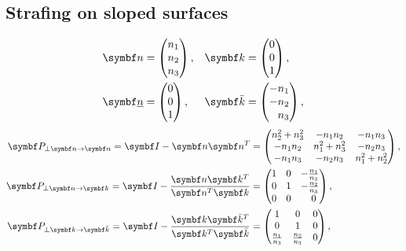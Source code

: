 \subsection{Strafing on sloped surfaces}
\label{sec:slopes}
\begin{align*}
\vec{n} &=
\begin{pmatrix}
n_1\\n_2\\n_3
\end{pmatrix}, & \vec{k} &=
\begin{pmatrix}
0\\0\\1
\end{pmatrix},\\
\vec{\flat{n}} &=
\begin{pmatrix}
0\\0\\1
\end{pmatrix}, &
\vec{\bar{k}} &=
\begin{pmatrix}
-n_1\\-n_2\\\hphantom{-}n_3
\end{pmatrix},
\end{align*}
%
\begin{align*}
\mat{P}_{\perp \vec{n} \rightarrow \vec{n}} = \mat{I} - \vec{n}\vec{n}^T &=
\begin{pmatrix}
n_2^2+n_3^2 & -n_1 n_2 & -n_1 n_3\\
-n_1 n_2 & n_1^2+n_3^2 & -n_2 n_3\\
-n_1 n_3 & -n_2 n_3 & n_1^2+n_2^2
\end{pmatrix},\\
\mat{P}_{\perp \vec{n} \rightarrow \vec{k}} = \mat{I} - \frac{\vec{n}\vec{k}^T}{\vec{n}^T\vec{k}} &=
\begin{pmatrix}
1 & 0 & -\frac{n_1}{n_3}\\
0 & 1 & -\frac{n_2}{n_3}\\
0 & 0 & \hphantom{-}0
\end{pmatrix},\\
\mat{P}_{\perp \vec{k} \rightarrow \vec{\bar{k}}} = \mat{I} - \frac{\vec{k}\vec{\bar{k}}^T}{\vec{k}^T\vec{\bar{k}}} &=
\begin{pmatrix}
1 & 0 & 0\\
0 & 1 & 0\\
\frac{n_1}{n_3} & \frac{n_2}{n_3} & 0
\end{pmatrix},
\end{align*}

